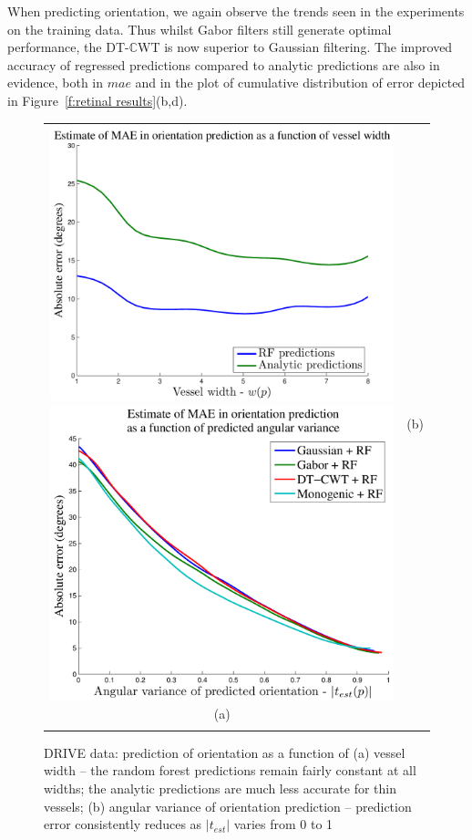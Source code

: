 \documentclass{IEEEtran}
\newcommand{\fref}[1]{Figure~\ref{#1}}
\def\dtcwt{DT-$\mathbb{C}$WT}
\begin{document}
When predicting orientation, we again observe the trends seen in the experiments on the training data. Thus whilst Gabor filters still generate optimal performance, the \dtcwt{} is now superior to Gaussian filtering. The improved accuracy of regressed predictions compared to analytic predictions are also in evidence, both in $mae$ and in the plot of cumulative distribution of error depicted in \fref{f:retinal results}(b,d).

\begin{figure}[t]
\centering
\begin{tabular}{@{}c c@{}} %
\includegraphics[width=0.48\columnwidth]{figs/retina/ret_vessels_gabor_scales_v_width}
\includegraphics[width=0.48\columnwidth]{figs/retina/drive_RF_err_v_var}
(a) & (b) \\
\noalign{\smallskip}
\end{tabular}
%
\caption{DRIVE data: prediction of orientation as a function of (a) vessel width -- the random forest predictions remain fairly constant at all widths; the analytic predictions are much less accurate for thin vessels; (b) angular variance of orientation prediction -- prediction error consistently reduces as $|t_{est}|$ varies from 0 to 1}
\label{f:drive_gabor_v_width}
\end{figure}
\end{document}
